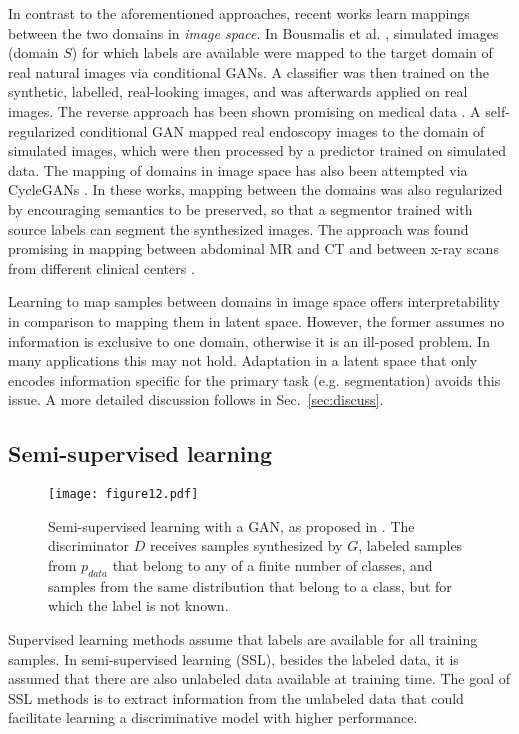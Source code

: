 \documentclass{article}
\begin{document}
In contrast to the aforementioned approaches, recent works learn mappings between the two domains in \emph{image space}. In Bousmalis et al. \cite{bousmalis2017unsupervised}, simulated images (domain $S$) for which labels are available were mapped to the target domain of real natural images via conditional GANs. A classifier was then trained on the synthetic, labelled, real-looking images, and was afterwards applied on real images. The reverse approach has been shown promising on medical data \cite{mahmood2017unsupervised}. 
A self-regularized conditional GAN mapped real endoscopy images to the domain of simulated images, which were then processed by a predictor trained on simulated data.
The mapping of domains in image space has also been attempted via CycleGANs \cite{huo2018adversarial,chen2018semantic}. In these works, mapping between the domains was also regularized by encouraging semantics to be preserved, so that a segmentor trained with source labels can segment the synthesized images. The approach was found promising in mapping between abdominal MR and CT \cite{huo2018adversarial} and between x-ray scans from different clinical centers \cite{chen2018semantic}.

Learning to map samples between domains in image space offers interpretability in comparison to mapping them in latent space. However, the former assumes no information is exclusive to one domain, otherwise it is an ill-posed problem. In many applications this may not hold. Adaptation in a latent space that only encodes information specific for the primary task (e.g. segmentation) avoids this issue. A more detailed discussion follows in Sec.~\ref{sec:discuss}.

\subsection{Semi-supervised learning}
\label{sec:semisuper}

\begin{figure}[tp]
\centering
\texttt{[image: figure12.pdf]}
\caption{Semi-supervised learning with a GAN, as proposed in \cite{Sali16}. The discriminator $D$ receives samples synthesized by $G$, labeled samples from $p_{data}$ that belong to any of a finite number of classes, and samples from the same distribution that belong to a class, but for which the label is not known.}
\label{fig:SGAN}
\end{figure}

Supervised learning methods assume that labels are available for all training samples. In semi-supervised learning (SSL), besides the labeled data, it is assumed that there are also unlabeled data available at training time. The goal of SSL methods is to extract information from the unlabeled data that could facilitate learning a discriminative model with higher performance.
\end{document}
